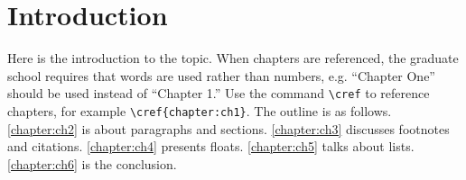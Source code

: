 \chapter{Introduction}
\label{chapter:ch1}

Here is the introduction to the topic.
When chapters are referenced, the graduate school requires that words are used rather than numbers, e.g. ``Chapter One'' should be used instead of ``Chapter 1.''
Use the command \verb|\cref| to reference chapters, for example \verb|\cref{chapter:ch1}|.
The outline is as follows.
\cref{chapter:ch2} is about paragraphs and sections.
\cref{chapter:ch3} discusses footnotes and citations.
\cref{chapter:ch4} presents floats.
\cref{chapter:ch5} talks about lists.
\cref{chapter:ch6} is the conclusion.

